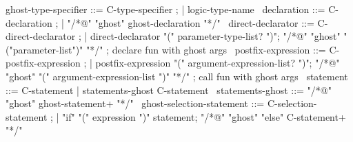 \begin{syntax}

  ghost-type-specifier ::= C-type-specifier ;
  | {logic-type-name} \
  declaration ::= C-declaration ;
  | "/*@" "ghost" ghost-declaration "*/" \
  direct-declarator ::= C-direct-declarator ;
    | direct-declarator "(" parameter-type-list? ")";
        {"/*@" "ghost" "("parameter-list")" "*/"} ; declare fun with ghost args
        \
  postfix-expression ::= C-postfix-expression ;
    | postfix-expression "(" argument-expression-list? ")";
    {"/*@" "ghost" "(" argument-expression-list ")" "*/"} ; call fun with ghost args
    \
  statement ::= C-statement | statements-ghost C-statement \
  statements-ghost ::= "/*@" "ghost" ghost-statement+ "*/" \
  ghost-selection-statement ::= C-selection-statement ;
    | "if" "(" expression ")" statement;
      {"/*@" "ghost" "else" C-statement+ "*/"} \

\end{syntax}

